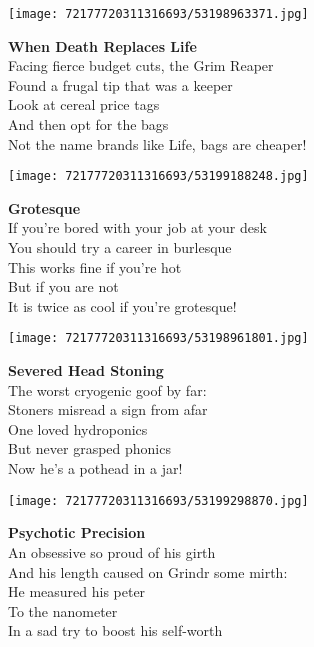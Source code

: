 \documentclass[10pt,letterpaper]{article}
\begin{document}
\begin{center}\texttt{[image: 72177720311316693/53198963371.jpg]}
\end{center}
\begin{center}
\textbf{When Death Replaces Life}\\
\vskip 0.2in
Facing fierce budget cuts, the Grim Reaper\\
Found a frugal tip that was a keeper\\
Look at cereal price tags\\
And then opt for the bags\\
Not the name brands like Life, bags are cheaper!\\
\end{center}
\pagebreak

\begin{center}
\texttt{[image: 72177720311316693/53199188248.jpg]}
\end{center}

\begin{center}
\textbf{Grotesque}\\
\vskip 0.2in
If you're bored with your job at your desk\\
You should try a career in burlesque\\
This works fine if you're hot\\
But if you are not\\
It is twice as cool if you're grotesque!\\
\end{center}
\pagebreak

\begin{center}
\texttt{[image: 72177720311316693/53198961801.jpg]}
\end{center}

\begin{center}
\textbf{Severed Head Stoning}\\
\vskip 0.2in
The worst cryogenic goof by far:\\
Stoners misread a sign from afar\\
One loved hydroponics\\
But never grasped phonics\\
Now he's a pothead in a jar!\\
\end{center}
\pagebreak

\begin{center}\texttt{[image: 72177720311316693/53199298870.jpg]}
\end{center}
\begin{center}
\textbf{Psychotic Precision}\\
\vskip 0.2in
An obsessive so proud of his girth\\
And his length caused on Grindr some mirth:\\
He measured his peter\\
To the nanometer\\
In a sad try to boost his self-worth\\
\end{center}
\pagebreak
\end{document}
